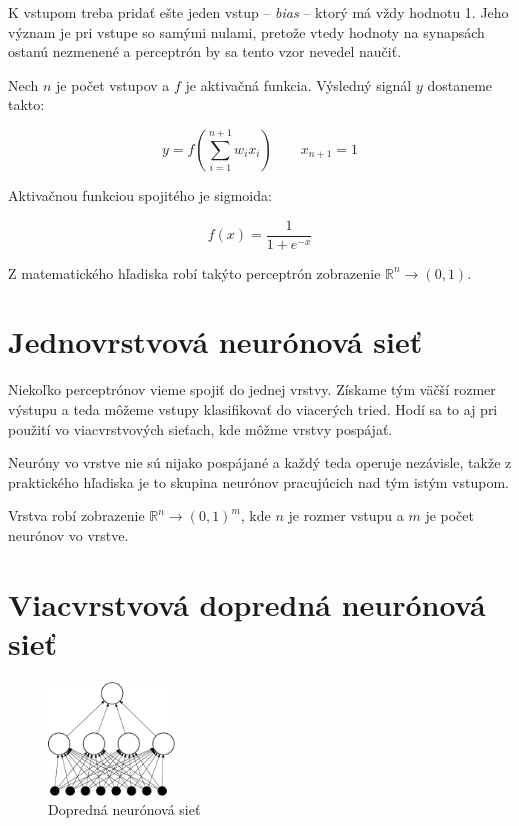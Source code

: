 K vstupom treba pridať ešte jeden vstup -- \textit{bias} -- ktorý má vždy hodnotu 1. Jeho význam je pri vstupe so samými nulami, pretože vtedy hodnoty na synapsách ostanú nezmenené a perceptrón by sa tento vzor nevedel naučiť.

Nech $n$ je počet vstupov a  $f$ je aktivačná funkcia. Výsledný signál $y$ dostaneme takto:

$$y= f\left(\sum_{i=1}^{n+1} w_i x_i \right)\qquad x_{n+1}=1$$\medskip

Aktivačnou funkciou spojitého je sigmoida: 

$$f(x) = \frac{1}{1+e^{-x}}$$\medskip

Z matematického hľadiska robí takýto perceptrón zobrazenie $\mathbb{R}^n\rightarrow (0,1)$.

\section{Jednovrstvová neurónová sieť}

Niekoľko perceptrónov vieme spojiť do jednej vrstvy. Získame tým väčší rozmer výstupu a teda môžeme vstupy klasifikovať do viacerých tried. Hodí sa to aj pri použití vo viacvrstvových sieťach, kde môžme vrstvy pospájať.

Neuróny vo vrstve nie sú nijako pospájané a každý teda operuje nezávisle, takže z praktického hľadiska je to skupina neurónov pracujúcich nad tým istým vstupom.

Vrstva robí zobrazenie $\mathbb{R}^n\rightarrow (0,1)^m$, kde $n$ je rozmer vstupu a $m$ je počet neurónov vo vrstve.

\section{Viacvrstvová dopredná neurónová sieť}\label{chap:ffnn}

\begin{figure}[htbp]
  \begin{center}
    \includegraphics[width=0.3\textwidth]{images/ffnn}
  \end{center}
  \caption{Dopredná neurónová sieť}
  \label{fig:ffnn}
\end{figure}

